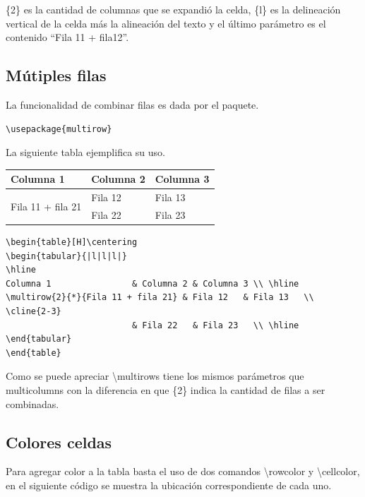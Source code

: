 \documentclass[letterpaper, 10pt, journal]{IEEEtran}
\begin{document}
\{2\} es la cantidad de columnas que se expandi\'{o} la celda, \{\textbar{}l\textbar{}\} es la delineaci\'{o}n vertical de la celda m\'{a}s la alineaci\'{o}n del texto y el \'{u}ltimo par\'{a}metro es el contenido \textquotedblleft{}Fila 11 + fila12\textquotedblright{}.

\subsection{M\'utiples filas}
La funcionalidad de combinar filas es dada por el paquete.

\lstset{language=Java}
\begin{lstlisting}
\usepackage{multirow}
\end{lstlisting}

La siguiente tabla ejemplifica su uso.

\begin{table}[H]\centering
\begin{tabular}{|l|l|l|}
\hline
Columna 1                & Columna 2 & Columna 3 \\ \hline
\multirow{2}{*}{Fila 11 + fila 21} & Fila 12   & Fila 13   \\ \cline{2-3} 
                         & Fila 22   & Fila 23   \\ \hline
\end{tabular}
\end{table}

\lstset{language=Java}
\begin{lstlisting}
\begin{table}[H]\centering
\begin{tabular}{|l|l|l|}
\hline
Columna 1                & Columna 2 & Columna 3 \\ \hline
\multirow{2}{*}{Fila 11 + fila 21} & Fila 12   & Fila 13   \\ \cline{2-3} 
                         & Fila 22   & Fila 23   \\ \hline
\end{tabular}
\end{table}
\end{lstlisting}

Como se puede apreciar \textbackslash{}multirows tiene los mismos par\'{a}metros que multicolumns con la diferencia en que \{2\} indica la cantidad de filas a ser combinadas.

\subsection{Colores celdas}
Para agregar color a la tabla basta el uso de dos comandos \textbackslash{}rowcolor y \textbackslash{}cellcolor, en el siguiente c\'{o}digo se muestra la ubicaci\'{o}n correspondiente de cada uno.
\end{document}
